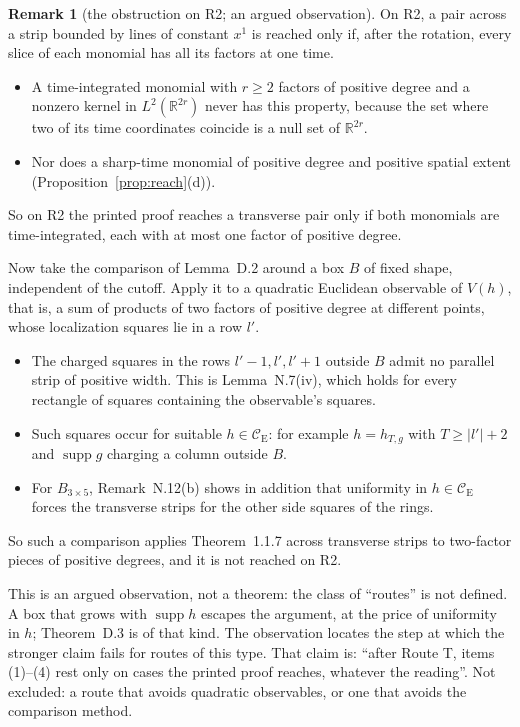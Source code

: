 \documentclass[11pt,a4paper]{article}
\newcommand{\R}{\mathbb{R}}
\newcommand{\CE}{\mathcal{C}_{\mathrm E}}
\DeclareMathOperator{\supp}{supp}
\theoremstyle{plain}
\theoremstyle{definition}
\newtheorem{trem}[tlemma]{Remark}
\begin{document}
\begin{trem}[the obstruction on R2; an argued observation]\label{rem:obstruction}
On R2, a pair across a strip bounded by lines of constant $x^1$ is reached only if, after the
rotation, every slice of each monomial has all its factors at one time.
\begin{itemize}
\item A time-integrated monomial with $r\ge2$ factors of positive degree and a nonzero kernel in
$L^2(\R^{2r})$ never has this property, because the set where two of its time coordinates
coincide is a null set of $\R^{2r}$.
\item Nor does a sharp-time monomial of positive degree and positive spatial extent
(Proposition~\ref{prop:reach}(d)).
\end{itemize}
So on R2 the printed proof reaches a transverse pair only if both monomials are time-integrated,
each with at most one factor of positive degree.

Now take the comparison of Lemma~D.2 around a box $B$ of fixed shape, independent of the cutoff.
Apply it to a quadratic Euclidean observable of $V(h)$, that is, a sum of products of two factors
of positive degree at different points, whose localization squares lie in a row $l'$.
\begin{itemize}
\item The charged squares in the rows $l'-1,l',l'+1$ outside $B$ admit no parallel strip of positive
width.  This is Lemma~N.7(iv), which holds for every rectangle of squares containing the
observable's squares.
\item Such squares occur for suitable $h\in\CE$: for example $h=h_{T,g}$ with $T\ge|l'|+2$ and
$\supp g$ charging a column outside $B$.
\item For $B_{3\times5}$, Remark~N.12(b) shows in addition that uniformity in $h\in\CE$ forces the
transverse strips for the other side squares of the rings.
\end{itemize}
So such a comparison applies Theorem~1.1.7 across transverse strips to two-factor pieces of
positive degrees, and it is not reached on R2.

This is an argued observation, not a theorem: the class of ``routes'' is not defined.  A box that
grows with $\supp h$ escapes the argument, at the price of uniformity in $h$; Theorem~D.3 is of
that kind.  The observation locates the step at which the stronger claim fails for routes of this
type.  That claim is: ``after Route T, items (1)--(4) rest only on cases the printed proof reaches,
whatever the reading''.  Not excluded: a route that avoids quadratic observables, or one that
avoids the comparison method.
\end{trem}
\end{document}
